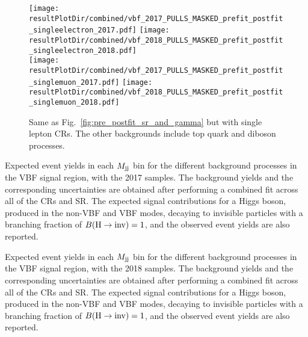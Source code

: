 \begin{figure}[htbp]
    \centering
        \texttt{[image: \\resultPlotDir/combined/vbf\_2017\_PULLS\_MASKED\_prefit\_postfit\_singleelectron\_2017.pdf]}
        \texttt{[image: \\resultPlotDir/combined/vbf\_2018\_PULLS\_MASKED\_prefit\_postfit\_singleelectron\_2018.pdf]} \\
        \texttt{[image: \\resultPlotDir/combined/vbf\_2017\_PULLS\_MASKED\_prefit\_postfit\_singlemuon\_2017.pdf]}
        \texttt{[image: \\resultPlotDir/combined/vbf\_2018\_PULLS\_MASKED\_prefit\_postfit\_singlemuon\_2018.pdf]}
    \caption{Same as Fig.~\ref{fig:pre_postfit_sr_and_gamma} but with single lepton CRs. The other backgrounds include top 
    quark and diboson processes.}
    \label{fig:pre_postfit_single_lepton_regions}
\end{figure}

\clearpage

\begin{sidewaystable}[h!]
    \centering
    \caption{
        Expected event yields in each $M_{\textrm{jj}}$ bin for the different background
        processes in the VBF signal region, with the 2017 samples. The
        background yields and the corresponding uncertainties are obtained
        after performing a combined fit across all of the CRs and SR. The
        expected signal contributions for a Higgs boson, produced in the non-VBF
        and VBF modes, decaying to invisible particles with a branching
        fraction of ${{B}(\textrm{H}\rightarrow\text{inv})} = 1$, and the observed event yields are also
        reported.}
        \cmsTable{
            \renewcommand{\arraystretch}{1.2}
            
        }
    \label{tab:yields_MTR_2017}
   
\end{sidewaystable}

\begin{sidewaystable}[h!]
    \centering
    \caption{
    Expected event yields in each $M_{\textrm{jj}}$ bin for the different background
    processes in the VBF signal region, with the 2018 samples. The
    background yields and the corresponding uncertainties are obtained
    after performing a combined fit across all of the CRs and SR. The
    expected signal contributions for a Higgs boson, produced in the non-VBF
    and VBF modes, decaying to invisible particles with a branching
    fraction of ${{B}(\textrm{H}\rightarrow\text{inv})} = 1$, and the observed event yields are also
    reported.}
    \label{tab:yields_MTR_2018}
    \cmsTable{
        \renewcommand{\arraystretch}{1.2}
        
    }
\end{sidewaystable}

\clearpage


